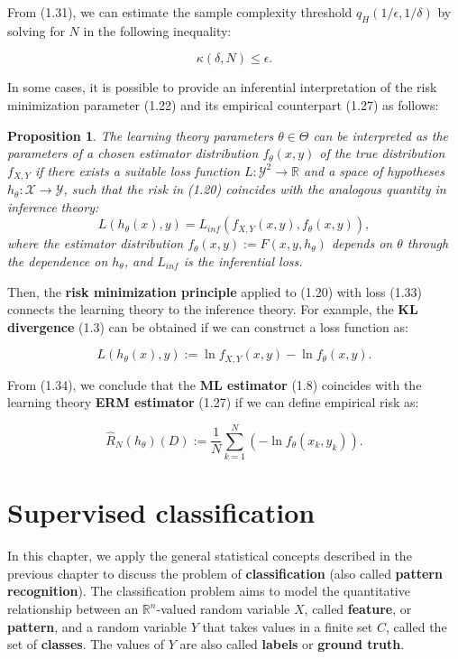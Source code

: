 \documentclass{report}
\newtheorem{proposition}{Proposition}[chapter]
\begin{document}
From (1.31), we can estimate the sample complexity threshold $q_H(1/\epsilon, 1/\delta)$ by solving for $N$ in the following inequality:

\begin{equation}
\kappa(\delta,N) \leq \epsilon.
\end{equation}

In some cases, it is possible to provide an inferential interpretation of the risk minimization parameter (1.22) and its empirical counterpart (1.27) as follows:

\begin{proposition}
The learning theory parameters $\theta \in \Theta$ can be interpreted as the parameters of a chosen estimator distribution $f_\theta(x,y)$ of the true distribution $f_{X,Y}$ if there exists a suitable loss function $L : \mathcal{Y}^2 \to \mathbb{R}$ and a space of hypotheses $h_\theta: \mathcal{X} \to \mathcal{Y}$, such that the risk in (1.20) coincides with the analogous quantity in inference theory:
\begin{equation}
L(h_\theta(x), y) = L_{inf}(f_{X,Y}(x,y),f_\theta(x,y)),
\end{equation}
where the estimator distribution $f_\theta(x,y) := F(x,y,h_\theta)$ depends on $\theta$ through the dependence on $h_\theta$, and $L_{inf}$ is the inferential loss.
\end{proposition}

Then, the \textbf{risk minimization principle} applied to (1.20) with loss (1.33) connects the learning theory to the inference theory. For example, the \textbf{KL divergence} (1.3) can be obtained if we can construct a loss function as:

\begin{equation}
L(h_\theta(x), y) := \ln f_{X,Y}(x,y) -\ln f_\theta(x,y).
\end{equation}

From (1.34), we conclude that the \textbf{ML estimator} (1.8) coincides with the learning theory \textbf{ERM estimator} (1.27) if we can define empirical risk as:

\begin{equation}
\hat{R}_N(h_\theta)(D) := \frac{1}{N}\sum_{k=1}^N (-\ln f_\theta(x_k,y_k)).
\end{equation}

\chapter{Supervised classification}
In this chapter, we apply the general statistical concepts described in the previous chapter to discuss the problem of \textbf{classification} (also called \textbf{pattern recognition}). The classification problem aims to model the quantitative relationship between an $\mathbb{R}^n$-valued random variable $X$, called \textbf{feature}, or \textbf{pattern}, and a random variable $Y$ that takes values in a finite set $C$, called the set of \textbf{classes}. The values of $Y$ are also called \textbf{labels} or \textbf{ground truth}.
\end{document}
